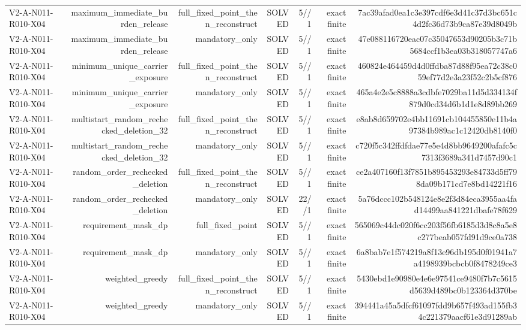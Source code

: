 {\begin{longtable}{lrrrrrr}
V2-A-N011-R010-X04 & maximum\_immediate\_burden\_release & full\_fixed\_point\_then\_reconstruct & SOLVED & 5//1 & exact finite & 7ac39afad0ea1c3e397cdf6e3d41c37d3bc651c4d2fc36d73b9ca87e39d8049b \\
V2-A-N011-R010-X04 & maximum\_immediate\_burden\_release & mandatory\_only & SOLVED & 5//1 & exact finite & 47e088116720eac07c35047653d90205b3c71b5684ccf1b3ea03b318057747a6 \\
V2-A-N011-R010-X04 & minimum\_unique\_carrier\_exposure & full\_fixed\_point\_then\_reconstruct & SOLVED & 5//1 & exact finite & 460824e464459d4d0ffdba87d88f95ea72c38c059ef77d2e3a23f52c2b5cf876 \\
V2-A-N011-R010-X04 & minimum\_unique\_carrier\_exposure & mandatory\_only & SOLVED & 5//1 & exact finite & 465a4e2e5c8888a3cdbfe7029ba11d5d334134f879d0cd34d6b1d1e8d89bb269 \\
V2-A-N011-R010-X04 & multistart\_random\_rechecked\_deletion\_32 & full\_fixed\_point\_then\_reconstruct & SOLVED & 5//1 & exact finite & e8ab8d659702e4bb11691cb104455850e11b4a97384b989ac1c12420db8140f0 \\
V2-A-N011-R010-X04 & multistart\_random\_rechecked\_deletion\_32 & mandatory\_only & SOLVED & 5//1 & exact finite & c720f5c342ffdfdae77e5e4d8bb9649200afafc5c7313f3689a341d7457d90c1 \\
V2-A-N011-R010-X04 & random\_order\_rechecked\_deletion & full\_fixed\_point\_then\_reconstruct & SOLVED & 5//1 & exact finite & ce2a407160f13f7851b895453293e84733d5ff798da09b171cd7e8bd14221f16 \\
V2-A-N011-R010-X04 & random\_order\_rechecked\_deletion & mandatory\_only & SOLVED & 22//1 & exact finite & 5a76dccc102b548124e8e2f3d84eca3955aa4fad14499aa841221dbafe78f629 \\
V2-A-N011-R010-X04 & requirement\_mask\_dp & full\_fixed\_point & SOLVED & 5//1 & exact finite & 565069c44dc020f6cc203f56fb6185d3d8c8a5e8c277beab057fd91d9ce0a738 \\
V2-A-N011-R010-X04 & requirement\_mask\_dp & mandatory\_only & SOLVED & 5//1 & exact finite & 6a8bab7e1f574219a8f13e96db195d0f01941a7a4198939bcbcb0f8478249ce3 \\
V2-A-N011-R010-X04 & weighted\_greedy & full\_fixed\_point\_then\_reconstruct & SOLVED & 5//1 & exact finite & 5430ebd1e90980e4e6e97541ce9480f7b7c5615d5639d489bc0b123364d370be \\
V2-A-N011-R010-X04 & weighted\_greedy & mandatory\_only & SOLVED & 5//1 & exact finite & 394441a45a5dfcf61097fdd9b657f493ad155fb34c221379aacf61e3d91289ab \\

\end{longtable}}
